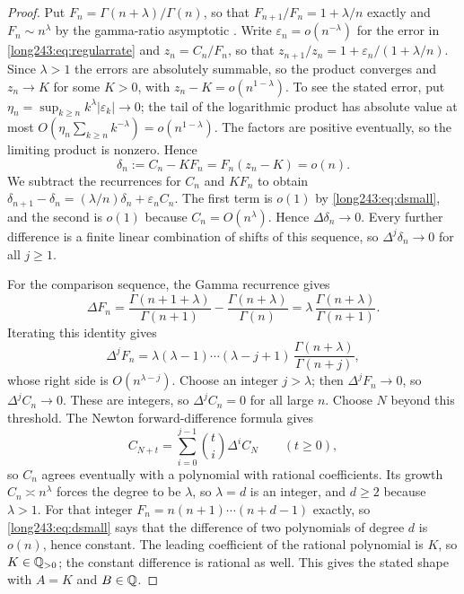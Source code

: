 \documentclass[11pt]{article}
\begin{document}
\begin{proof}
Put $F_n=\Gamma(n+\lambda)/\Gamma(n)$, so that $F_{n+1}/F_n=1+\lambda/n$
exactly and $F_n\sim n^\lambda$ by the gamma-ratio asymptotic
\cite[5.11.12]{dlmf_gamma}. Write $\varepsilon_n=o(n^{-\lambda})$ for the
error in \eqref{long243:eq:regularrate} and $z_n=C_n/F_n$, so that
$z_{n+1}/z_n=1+\varepsilon_n/(1+\lambda/n)$.  Since $\lambda>1$ the errors are
absolutely summable, so the product converges and $z_n\to K$ for some $K>0$,
with $z_n-K=o(n^{1-\lambda})$. To see the stated error, put
$\eta_n=\sup_{k\ge n}k^\lambda|\varepsilon_k|\to0$; the tail of the
logarithmic product has absolute value at most
$O(\eta_n\sum_{k\ge n}k^{-\lambda})=o(n^{1-\lambda})$.
The factors are positive eventually, so the limiting product is nonzero.  Hence
\begin{equation}\label{long243:eq:dsmall}
 \delta_n:=C_n-KF_n=F_n(z_n-K)=o(n).
\end{equation}
We subtract the recurrences for $C_n$ and $KF_n$ to obtain
$\delta_{n+1}-\delta_n=(\lambda/n)\delta_n+\varepsilon_nC_n$.
The first term is $o(1)$ by \eqref{long243:eq:dsmall}, and the second
is $o(1)$ because $C_n=O(n^\lambda)$. Hence $\Delta\delta_n\to0$.
Every further difference is a finite linear combination of shifts of
this sequence, so $\Delta^j\delta_n\to0$ for all $j\ge1$.

For the comparison sequence, the Gamma recurrence gives
\[
 \Delta F_n
 =\frac{\Gamma(n+1+\lambda)}{\Gamma(n+1)}
  -\frac{\Gamma(n+\lambda)}{\Gamma(n)}
 =\lambda\,\frac{\Gamma(n+\lambda)}{\Gamma(n+1)}.
\]
Iterating this identity gives
\[
 \Delta^jF_n=\lambda(\lambda-1)\cdots(\lambda-j+1)\,
 \frac{\Gamma(n+\lambda)}{\Gamma(n+j)},
\]
whose right side is $O(n^{\lambda-j})$.  Choose an integer $j>\lambda$; then
$\Delta^jF_n\to0$, so $\Delta^jC_n\to0$.  These are integers, so
$\Delta^jC_n=0$ for all large $n$. Choose $N$ beyond this threshold.
The Newton forward-difference formula gives
\[
 C_{N+t}=\sum_{i=0}^{j-1}\binom ti\Delta^iC_N\qquad(t\ge0),
\]
so $C_n$ agrees eventually with a polynomial with rational coefficients.
Its growth $C_n\asymp n^\lambda$ forces
the degree to be $\lambda$, so $\lambda=d$ is an integer, and $d\ge2$ because
$\lambda>1$.  For that integer $F_n=n(n+1)\cdots(n+d-1)$ exactly, so
\eqref{long243:eq:dsmall} says that the difference of two polynomials of degree $d$ is
$o(n)$, hence constant. The leading coefficient of the rational polynomial
is $K$, so $K\in\mathbb{Q}_{>0}$; the constant difference is rational as well.
This gives the stated shape with $A=K$ and $B\in\mathbb{Q}$.
\end{proof}
\end{document}
